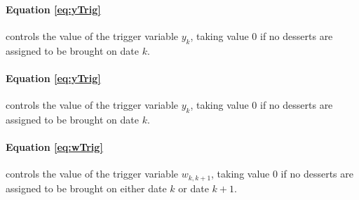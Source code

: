 \documentclass[11pt,letterpaper]{article}
\begin{document}
\paragraph{Equation \eqref{eq:yTrig}} controls the value of the trigger variable $y_k$, taking value 0 if no desserts are assigned to be brought on date $k$.

\paragraph{Equation \eqref{eq:yTrig}} controls the value of the trigger variable $y_k$, taking value 0 if no desserts are assigned to be brought on date $k$.

\paragraph{Equation \eqref{eq:wTrig}} controls the value of the trigger variable $w_{k,k+1}$, taking value 0 if no desserts are assigned to be brought on either date $k$ or date $k+1$.
\end{document}

